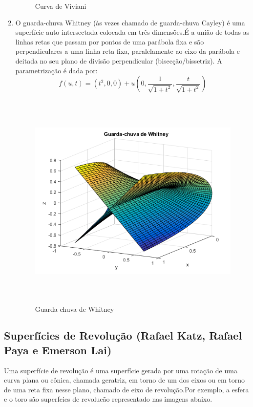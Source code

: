 \documentclass[a4paper]{article}
\begin{document}
\begin{enumerate}
\begin{figure}[H]
\caption{Curva de Viviani}
\label{gráfico4}
\end{figure}
\item O guarda-chuva Whitney (às vezes chamado de guarda-chuva Cayley) é uma superfície auto-intersectada colocada em três dimensões.É a união de todas as linhas retas que passam por pontos de uma parábola fixa e são perpendiculares a uma linha reta fixa, paralelamente ao eixo da parábola e deitada no seu plano de divisão perpendicular (bisecção/bissetriz). A parametrização é dada por:
$$f(u,t)=(t^2,0,0)+u(0,\frac{1}{\sqrt{1+t^2}},\frac{t}{\sqrt{1+t^2}})$$

\begin{figure}[H]
\centering
\includegraphics[height=11cm]{Guarda_chuva_de_Whitney.png}
\caption{Guarda-chuva de Whitney}
\label{gráfico5}
\end{figure}
\end{enumerate}
\subsection{Superfícies de Revolução (Rafael Katz, Rafael Paya e Emerson Lai)}
Uma superfície de revolução é uma superfície gerada por uma rotação de uma curva plana ou cônica, chamada geratriz, em torno de um dos eixos ou em torno de uma reta fixa nesse plano, chamado de eixo de revolução.Por exemplo, a esfera e o toro são superfcies de revolucão representado nas imagens abaixo. 
\end{document}

